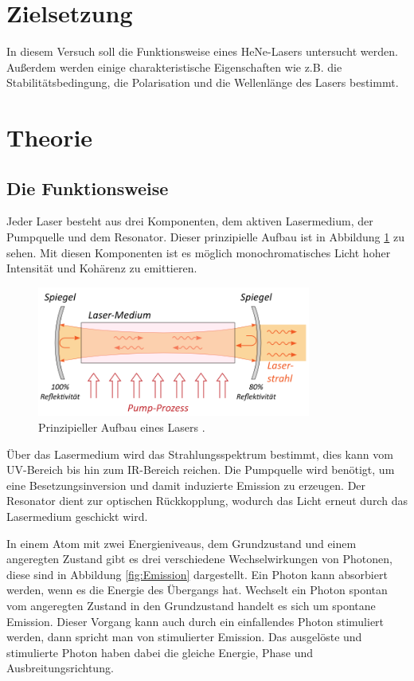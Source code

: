 \section{Zielsetzung}
In diesem Versuch soll die Funktionsweise eines HeNe-Lasers untersucht werden. Außerdem werden einige
charakteristische Eigenschaften wie z.B. die Stabilitätsbedingung, die Polarisation und die
Wellenlänge des Lasers bestimmt.

\section{Theorie}
\label{sec:Theorie}
\subsection{Die Funktionsweise}
Jeder Laser besteht aus drei Komponenten, dem aktiven Lasermedium, der Pumpquelle und dem
Resonator. Dieser prinzipielle Aufbau ist in Abbildung \ref{fig:aufbau} zu sehen.
Mit diesen Komponenten ist es möglich monochromatisches Licht hoher Intensität
und Kohärenz zu emittieren.

\begin{figure}[H]
  \centering
  \includegraphics[width=9cm]{Aufbau3.png}
  \caption{Prinzipieller Aufbau eines Lasers \cite{Laser}.}
  \label{fig:aufbau}
\end{figure}

Über das Lasermedium wird das Strahlungsspektrum bestimmt, dies kann vom UV-Bereich bis hin
zum IR-Bereich reichen. Die Pumpquelle wird benötigt, um eine Besetzungsinversion und damit
induzierte Emission zu erzeugen. Der Resonator dient zur optischen Rückkopplung, wodurch das
Licht erneut durch das Lasermedium geschickt wird.

In einem Atom mit zwei Energieniveaus, dem Grundzustand und einem angeregten Zustand gibt es
drei verschiedene Wechselwirkungen von Photonen, diese sind in Abbildung \ref{fig:Emission} dargestellt.
Ein Photon kann absorbiert werden, wenn es die
Energie des Übergangs hat. Wechselt ein Photon spontan vom angeregten Zustand in den Grundzustand
handelt es sich um spontane Emission. Dieser Vorgang kann auch durch ein einfallendes Photon
stimuliert werden, dann spricht man von stimulierter Emission. Das ausgelöste und stimulierte Photon
haben dabei die gleiche Energie, Phase und Ausbreitungsrichtung.

